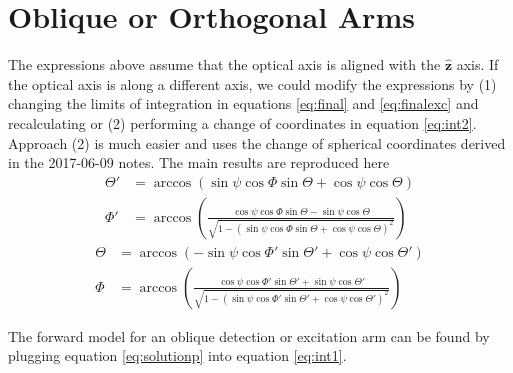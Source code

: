 \documentclass[11pt]{article}
\providecommand{\mh}[1]{\mathbf{\hat{#1}}}
\begin{document}
\section{Oblique or Orthogonal Arms}
The expressions above assume that the optical axis is aligned with the $\mh{z}$
axis. If the optical axis is along a different axis, we could modify the
expressions by (1) changing the limits of integration in equations
\ref{eq:final} and \ref{eq:finalexc} and recalculating or (2) performing a
change of coordinates in equation \ref{eq:int2}. Approach (2) is much easier and
uses the change of spherical coordinates derived in the 2017-06-09 notes. The
main results are reproduced here
\begin{subequations}
\begin{align}
  \Theta' &= \arccos\left(\sin\psi\cos\Phi\sin\Theta + \cos\psi\cos\Theta\right)\label{eq:thetap}\\
  \Phi' &= \arccos\left(\frac{\cos\psi\cos\Phi\sin\Theta - \sin\psi\cos\Theta}{\sqrt{1 - (\sin\psi\cos\Phi\sin\Theta + \cos\psi\cos\Theta)^2}}\right)\label{eq:phip}
\end{align}\label{eq:solution}%
\end{subequations}
\begin{subequations}
\begin{align}
  \Theta &= \arccos\left(-\sin\psi\cos\Phi'\sin\Theta' + \cos\psi\cos\Theta'\right)\\
  \Phi &= \arccos\left(\frac{\cos\psi\cos\Phi'\sin\Theta' + \sin\psi\cos\Theta'}{\sqrt{1 - (\sin\psi\cos\Phi'\sin\Theta' + \cos\psi\cos\Theta')^2}}\right)
\end{align}\label{eq:solutionp}%
\end{subequations}

The forward model for an oblique detection or excitation arm can be found by plugging
equation \ref{eq:solutionp} into equation \ref{eq:int1}.
\end{document}
